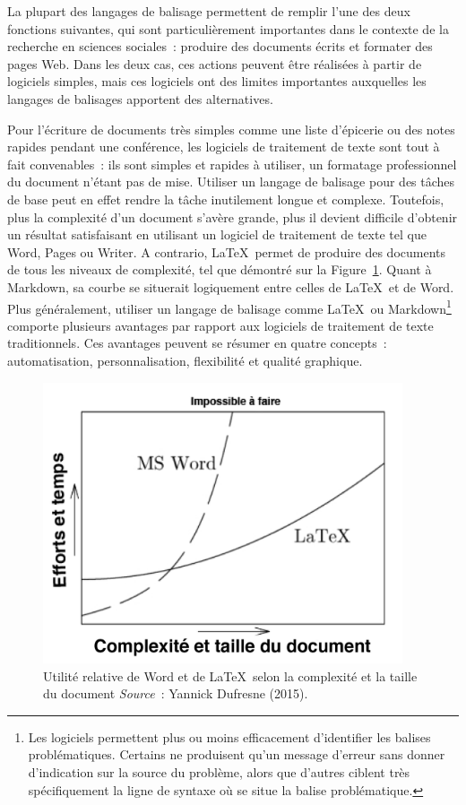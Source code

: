\documentclass[
  letterpaper,
]{scrbook}
\begin{document}
La plupart des langages de balisage permettent de remplir l'une des deux
fonctions suivantes, qui sont particulièrement importantes dans le
contexte de la recherche en sciences sociales~: produire des documents
écrits et formater des pages Web. Dans les deux cas, ces actions peuvent
être réalisées à partir de logiciels simples, mais ces logiciels ont des
limites importantes auxquelles les langages de balisages apportent des
alternatives.

Pour l'écriture de documents très simples comme une liste d'épicerie ou
des notes rapides pendant une conférence, les logiciels de traitement de
texte sont tout à fait convenables~: ils sont simples et rapides à
utiliser, un formatage professionnel du document n'étant pas de mise.
Utiliser un langage de balisage pour des tâches de base peut en effet
rendre la tâche inutilement longue et complexe. Toutefois, plus la
complexité d'un document s'avère grande, plus il devient difficile
d'obtenir un résultat satisfaisant en utilisant un logiciel de
traitement de texte tel que Word, Pages ou Writer. A contrario,
\LaTeX~permet de produire des documents de tous les niveaux de
complexité, tel que démontré sur la Figure~\ref{fig-latex-vs-word}.
Quant à Markdown, sa courbe se situerait logiquement entre celles de
\LaTeX~et de Word. Plus généralement, utiliser un langage de balisage
comme \LaTeX~ou Markdown\footnote{Les logiciels permettent plus ou moins
  efficacement d'identifier les balises problématiques. Certains ne
  produisent qu'un message d'erreur sans donner d'indication sur la
  source du problème, alors que d'autres ciblent très spécifiquement la
  ligne de syntaxe où se situe la balise problématique.} comporte
plusieurs avantages par rapport aux logiciels de traitement de texte
traditionnels. Ces avantages peuvent se résumer en quatre concepts~:
automatisation, personnalisation, flexibilité et qualité graphique.

\begin{figure}

{\centering \includegraphics[width=4.18in,height=\textheight]{images/chapitre5_word-vs-latex.png}

}

\caption{\label{fig-latex-vs-word}Utilité relative de Word et de
\LaTeX~selon la complexité et la taille du document
\newline \textit{Source}~: Yannick Dufresne (2015).}

\end{figure}
\end{document}
